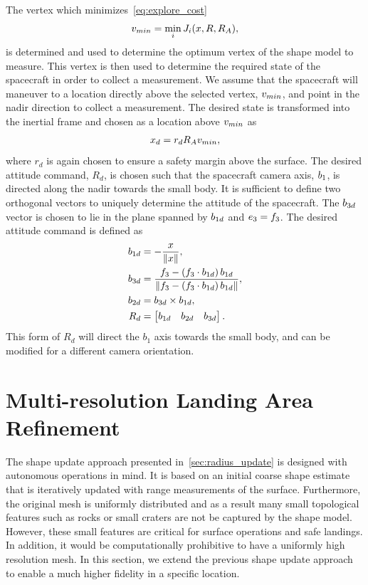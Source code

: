 \documentclass[letterpaper, paper,11pt]{AAS}		%
\begin{document}
The vertex which minimizes~\cref{eq:explore_cost} 
\begin{align*}
    v_{min} = \min_{i} J_i(x, R, R_A),
\end{align*}
is determined and used to determine the optimum vertex of the shape model to measure.
This vertex is then used to determine the required state of the spacecraft in order to collect a measurement.
We assume that the spacecraft will maneuver to a location directly above the selected vertex, \( v_{min} \), and point in the nadir direction to collect a measurement.
The desired state is transformed into the inertial frame and chosen as a location above \( v_{min} \) as
\begin{align}
    x_d = r_d R_A v_{min}, 
\end{align}
where \( r_d \) is again chosen to ensure a safety margin above the surface.
The desired attitude command, \( R_d\), is chosen such that the spacecraft camera axis, \( b_1 \), is directed along the nadir towards the small body.
It is sufficient to define two orthogonal vectors to uniquely determine the attitude of the spacecraft.
The \( b_{3d} \) vector is chosen to lie in the plane spanned by \(b_{1d} \) and \( e_3 = f_3 \).
The desired attitude command is defined as
\begin{align}
    b_{1d} &= - \frac{x}{\left\| x \right\|} , \\
    b_{3d} &= \frac{f_3 - \left( f_3 \cdot b_{1d} \right) b_{1d}}{\left\| f_3 - \left( f_3 \cdot b_{1d} \right) b_{1d} \right\|}, \\
    b_{2d} &= b_{3d} \times b_{1d} , \\
    R_d &= \begin{bmatrix} b_{1d} & b_{2d} & b_{3d} \end{bmatrix} .
\end{align}
This form of \( R_d \) will direct the \( b_1 \) axis towards the small body, and can be modified for a different camera orientation.

\section{Multi-resolution Landing Area Refinement}\label{sec:landing_refinement}

The shape update approach presented in~\cref{sec:radius_update} is designed with autonomous operations in mind. 
It is based on an initial coarse shape estimate that is iteratively updated with range measurements of the surface.
Furthermore, the original mesh is uniformly distributed and as a result many small topological features such as rocks or small craters are not be captured by the shape model. 
However, these small features are critical for surface operations and safe landings.
In addition, it would be computationally prohibitive to have a uniformly high resolution mesh.
In this section, we extend the previous shape update approach to enable a much higher fidelity in a specific location.
\end{document}
